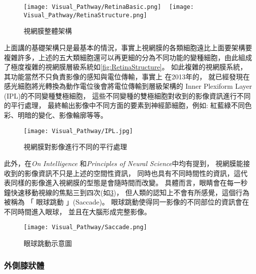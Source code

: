 \documentclass[class=NCU_thesis, crop=false]{standalone}
\begin{document}
\begin{figure}[H]
  \centering
    {\texttt{[image: Visual\_Pathway/RetinaBasic.png]}
    }
~
    {\texttt{[image: Visual\_Pathway/RetinaStructure.png]}
    }
  \caption{視網膜整體架構}
  \label{fig:RetinaTotalStructure}
\end{figure}

上面講的基礎架構只是最基本的情況，事實上視網膜的各類細胞遠比上面要架構要複雜許多，上述的五大類細胞還可以再更細的分為不同功能的變種細胞，由此組成了極度複雜的視網膜層級系統如\cref{fig:RetinaStructure}。
如此複雜的視網膜系統，其功能當然不只負責影像的感知與電位傳輸，事實上
在2013年的\cite{annurev}，
就已經發現在感光細胞將光轉換為動作電位後會將電位傳輸到層級架構的 Inner Plexiform Layer (IPL)的不同變種雙極細胞，
這些不同變種的雙極細胞對收到的影像資訊進行不同的平行處理，
最終輸出影像中不同方面的要素到神經節細胞，例如: 紅藍綠不同色彩、明暗的變化、影像輪廓等等。

\begin{figure}[H]
  \centering
  \texttt{[image: Visual\_Pathway/IPL.jpg]}
  \caption{視網膜對影像進行不同的平行處理~\cite{annurev}}
  \label{fig:IPL}
\end{figure}
\pagebreak

此外，在\textit{On Intelligence} \cite{10.5555993636}和\textit{Principles of Neural Science}\cite{1180370208}中均有提到，
視網膜能接收到的影像資訊不只是上述的空間性資訊，
同時也具有不同時間性的資訊，這代表同樣的影像進入視網膜的型態是會隨時間而改變。
具體而言，眼睛會在每一秒鐘快速移動視線的焦點三到四次(如\cref{fig:Saccade})，
但人類的認知上不會有所感覺，這個行為被稱為 「 眼球跳動 」(Saccade)。
眼球跳動使得同一影像的不同部位的資訊會在不同時間進入眼球，
並且在大腦形成完整影像。

\begin{figure}[H]
  \centering
  \texttt{[image: Visual\_Pathway/Saccade.png]}
  \caption{眼球跳動示意圖~\cite{annurev}}
  \label{fig:Saccade}
\end{figure}

\subsubsection{外側膝狀體}
\end{document}
